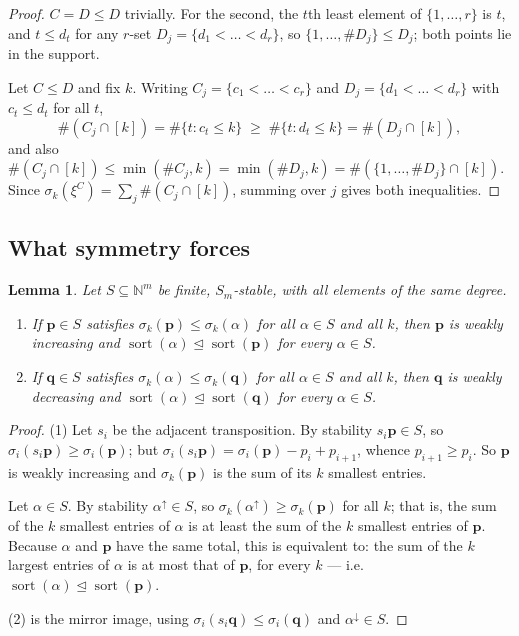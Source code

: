 \documentclass[11pt]{article}
\newtheorem{lem}[thm]{Lemma}
\theoremstyle{definition}
\DeclareMathOperator{\sort}{sort}
\newcommand{\N}{\mathbb{N}}
\begin{document}
\begin{proof}
$C=D\le D$ trivially. For the second, the $t$th least element of $\{1,\dots,r\}$ is $t$, and
$t\le d_t$ for any $r$-set $D_j=\{d_1<\dots<d_r\}$, so $\{1,\dots,\#D_j\}\le D_j$; both points
lie in the support.

Let $C\le D$ and fix $k$. Writing $C_j=\{c_1<\dots<c_r\}$ and $D_j=\{d_1<\dots<d_r\}$ with
$c_t\le d_t$ for all $t$,
\[
  \#(C_j\cap[k])=\#\{t:c_t\le k\}\;\ge\;\#\{t:d_t\le k\}=\#(D_j\cap[k]),
\]
and also $\#(C_j\cap[k])\le\min(\#C_j,k)=\min(\#D_j,k)=\#(\{1,\dots,\#D_j\}\cap[k])$. Since
$\sigma_k(\xi^C)=\sum_j\#(C_j\cap[k])$, summing over $j$ gives both inequalities.
\end{proof}

\subsection{What symmetry forces}

\begin{lem}\label{lem:sym}
Let $S\subseteq\N^m$ be finite, $S_m$-stable, with all elements of the same degree.
\begin{enumerate}
\item If $\mathbf{p}\in S$ satisfies $\sigma_k(\mathbf{p})\le\sigma_k(\alpha)$ for all
$\alpha\in S$ and all $k$, then $\mathbf{p}$ is weakly increasing and
$\sort(\alpha)\trianglelefteq\sort(\mathbf{p})$ for every $\alpha\in S$.
\item If $\mathbf{q}\in S$ satisfies $\sigma_k(\alpha)\le\sigma_k(\mathbf{q})$ for all
$\alpha\in S$ and all $k$, then $\mathbf{q}$ is weakly decreasing and
$\sort(\alpha)\trianglelefteq\sort(\mathbf{q})$ for every $\alpha\in S$.
\end{enumerate}
\end{lem}

\begin{proof}
(1) Let $s_i$ be the adjacent transposition. By stability $s_i\mathbf{p}\in S$, so
$\sigma_i(s_i\mathbf{p})\ge\sigma_i(\mathbf{p})$; but
$\sigma_i(s_i\mathbf{p})=\sigma_i(\mathbf{p})-p_i+p_{i+1}$, whence $p_{i+1}\ge p_i$. So
$\mathbf{p}$ is weakly increasing and $\sigma_k(\mathbf{p})$ is the sum of its $k$ smallest
entries.

Let $\alpha\in S$. By stability $\alpha^{\uparrow}\in S$, so
$\sigma_k(\alpha^{\uparrow})\ge\sigma_k(\mathbf{p})$ for all $k$; that is, the sum of the $k$
smallest entries of $\alpha$ is at least the sum of the $k$ smallest entries of $\mathbf{p}$.
Because $\alpha$ and $\mathbf{p}$ have the same total, this is equivalent to: the sum of the $k$
largest entries of $\alpha$ is at most that of $\mathbf{p}$, for every $k$ --- i.e.
$\sort(\alpha)\trianglelefteq\sort(\mathbf{p})$.

(2) is the mirror image, using $\sigma_i(s_i\mathbf{q})\le\sigma_i(\mathbf{q})$ and
$\alpha^{\downarrow}\in S$.
\end{proof}
\end{document}
